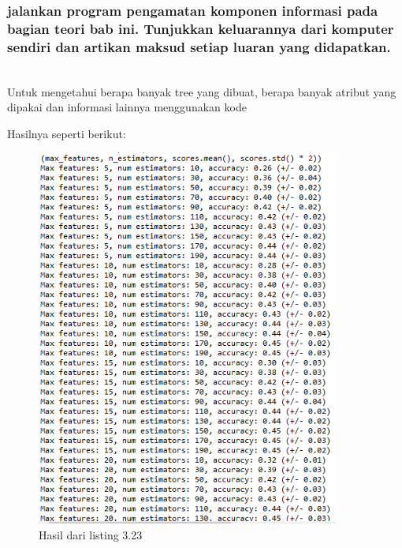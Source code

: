 \subsubsection{jalankan program pengamatan komponen informasi pada bagian teori bab ini. Tunjukkan keluarannya dari komputer sendiri dan artikan maksud setiap luaran yang didapatkan.}
\hfill\\
Untuk mengetahui berapa banyak tree yang dibuat, berapa banyak atribut yang dipakai dan informasi lainnya menggunakan kode

Hasilnya seperti berikut:
\begin{figure}[H]
	\centering
	\includegraphics[width=10cm]{figures/1174083/figures3/32.png}
	\caption{Hasil dari listing 3.23}
\end{figure}
